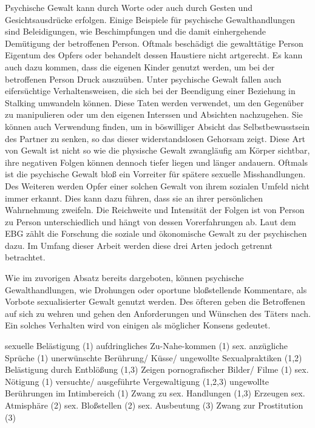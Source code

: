 Psychische Gewalt kann durch Worte oder auch durch Gesten und Gesichtsausdrücke erfolgen. %
Einige Beispiele für psychische Gewalthandlungen sind Beleidigungen, wie Beschimpfungen und die damit 
einhergehende Demütigung der betroffenen Person. Oftmals beschädigt die gewalttätige Person Eigentum
des Opfers oder behandelt dessen Haustiere nicht artgerecht. Es kann auch dazu kommen, dass die 
eigenen Kinder genutzt werden, um bei der betroffenen Person Druck auszuüben. Unter psychische Gewalt
fallen auch  eifersüchtige Verhaltensweisen, die sich bei der Beendigung einer Beziehung in Stalking
umwandeln können. %
Diese Taten werden verwendet, um den Gegenüber zu manipulieren oder um den eigenen Interssen und 
Absichten nachzugehen. Sie können auch Verwendung finden, um in böswilliger Absicht das 
Selbstbewusstsein des Partner zu senken, so das dieser widerstandslosen Gehorsam zeigt. %
Diese Art von Gewalt ist nicht so wie die physische Gewalt zwangläufig am Körper sichtbar, ihre 
negativen Folgen können dennoch tiefer liegen und länger andauern. %
Oftmals ist die psychische Gewalt bloß ein Vorreiter für spätere sexuelle Misshandlungen. %
Des Weiteren werden Opfer einer solchen Gewalt von ihrem sozialen Umfeld nicht immer erkannt. Dies 
kann dazu führen, dass sie an ihrer persönlichen Wahrnehmung zweifeln. Die Reichweite und Intensität
der Folgen ist von Person zu Person unterschiedlich und hängt von dessen Vorerfahrungen ab.
Laut dem EBG %
zählt die Forschung die soziale und ökonomische Gewalt zu der psychischen dazu. Im Umfang dieser 
Arbeit werden diese drei Arten jedoch getrennt betrachtet. 

Wie im zuvorigen Absatz bereits dargeboten, können psychische Gewalthandlungen, wie Drohungen oder 
oportune bloßstellende Kommentare, als Vorbote sexualisierter Gewalt genutzt werden. %
Des öfteren geben die Betroffenen auf sich zu wehren und gehen den Anforderungen und Wünschen des
Täters nach. Ein solches Verhalten wird von einigen als möglicher Konsens gedeutet. %


sexuelle Belästigung (1)
    aufdringliches Zu-Nahe-kommen (1)
    sex. anzügliche Sprüche (1)
    unerwünschte Berührung/ Küsse/ ungewollte Sexualpraktiken (1,2)
    Belästigung durch Entblößung (1,3)
    Zeigen pornografischer Bilder/ Filme (1)
sex. Nötigung (1)
versuchte/ ausgeführte Vergewaltigung (1,2,3)
ungewollte Berührungen im Intimbereich (1)
Zwang zu sex. Handlungen (1,3) 
Erzeugen sex. Atmisphäre (2)
sex. Bloßstellen (2)
sex. Ausbeutung (3)
Zwang zur Prostitution (3)

